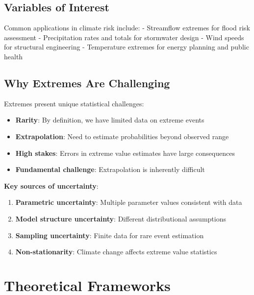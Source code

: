 \documentclass[
  letterpaper,
  DIV=11,
  numbers=noendperiod]{scrreprt}
\providecommand{\tightlist}{%
  \setlength{\itemsep}{0pt}\setlength{\parskip}{0pt}}
\begin{document}
\subsection{Variables of Interest}\label{variables-of-interest}

Common applications in climate risk include: - Streamflow extremes for
flood risk assessment - Precipitation rates and totals for stormwater
design - Wind speeds for structural engineering - Temperature extremes
for energy planning and public health

\subsection{Why Extremes Are
Challenging}\label{why-extremes-are-challenging}

Extremes present unique statistical challenges:

\begin{itemize}
\tightlist
\item
  \textbf{Rarity}: By definition, we have limited data on extreme events
\item
  \textbf{Extrapolation}: Need to estimate probabilities beyond observed
  range\\
\item
  \textbf{High stakes}: Errors in extreme value estimates have large
  consequences
\item
  \textbf{Fundamental challenge}: Extrapolation is inherently difficult
\end{itemize}

\textbf{Key sources of uncertainty}:

\begin{enumerate}
\def\labelenumi{\arabic{enumi}.}
\tightlist
\item
  \textbf{Parametric uncertainty}: Multiple parameter values consistent
  with data
\item
  \textbf{Model structure uncertainty}: Different distributional
  assumptions
\item
  \textbf{Sampling uncertainty}: Finite data for rare event estimation
\item
  \textbf{Non-stationarity}: Climate change affects extreme value
  statistics
\end{enumerate}

\section{Theoretical Frameworks}\label{theoretical-frameworks}
\end{document}
